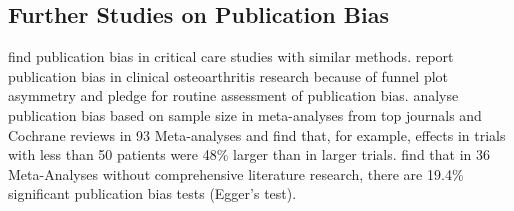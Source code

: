 \documentclass[11pt,a4paper,twoside]{book}\usepackage[]{graphicx}\usepackage[]{color}
\begin{document}
\subsection{Further Studies on Publication Bias}
\citet{Zhang.2013} find publication bias in critical care studies with similar methods. \citet{Nusch} report publication bias in clinical osteoarthritis research because of funnel plot asymmetry and pledge for routine assessment of publication bias. \citet{Dechartres.2013} analyse publication bias based on sample size in meta-analyses from top journals and Cochrane reviews in 93 Meta-analyses and find that, for example, effects in trials with less than 50 patients were 48\% larger than in larger trials. \citet{Onishi.2014} find that in 36 Meta-Analyses without comprehensive literature research, there are 19.4\% significant publication bias tests (Egger's test).
\end{document}
